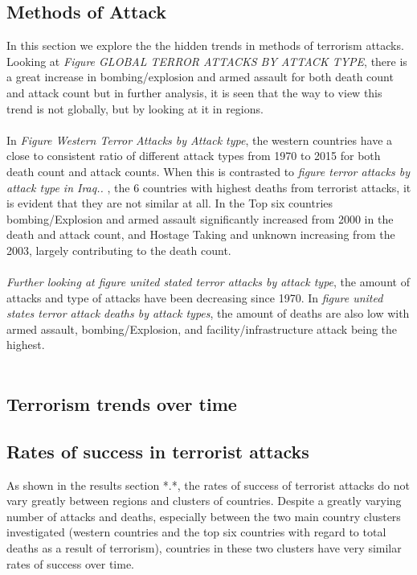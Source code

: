 \documentclass[10pt,a4paper]{article}
\begin{document}
\subsection{Methods of Attack}
In this section we explore the the hidden trends in methods of terrorism attacks. Looking at \textit{Figure GLOBAL TERROR ATTACKS BY ATTACK TYPE}, there is a great increase in bombing/explosion and armed assault for both death count and attack count but in further analysis, it is seen that the way to view this trend is not globally, but by looking at it in regions.
\\\\
In \textit{Figure Western Terror Attacks by Attack type}, the western countries have a close to consistent ratio of different attack types from 1970 to 2015 for both death count and attack counts. When this is contrasted to \textit{figure terror attacks by attack type in Iraq.. }, the 6 countries with highest deaths from terrorist attacks, it is evident that they are not similar at all. In the Top six countries bombing/Explosion and armed assault significantly increased from 2000 in the death and attack count, and Hostage Taking and unknown increasing from the 2003, largely contributing to the death count.
\\\\
\textit{Further looking at figure united stated terror attacks by attack type}, the amount of attacks and type of attacks have been decreasing since 1970. In \textit{figure united states terror attack deaths by attack types}, the amount of deaths are also low with armed assault, bombing/Explosion, and facility/infrastructure attack being the highest.
\\\

\subsection{Terrorism trends over time}

\subsection{Rates of success in terrorist attacks}
As shown in the results section *.*, the rates of success of terrorist attacks do not vary greatly between regions and clusters of countries. Despite a greatly varying number of attacks and deaths, especially between the two main country clusters investigated (western countries and the top six countries with regard to total deaths as a result of terrorism), countries in these two clusters have very similar rates of success over time. 
\end{document}
